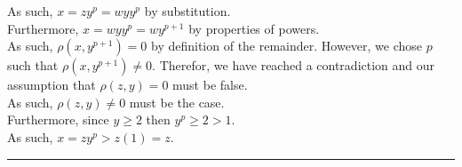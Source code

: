 \documentclass[a4paper,12pt]{article}
\begin{document}
\noindent As such, $x = zy^p = wyy^p$ by substitution.\\

\noindent Furthermore, $x = wyy^p = wy^{p + 1}$ by properties of powers.\\

\noindent As such, $\rho(x, y^{p + 1}) = 0$ by definition of the remainder. However, we chose $p$ such that $\rho(x, y^{p + 1}) \neq 0$. Therefor, we have reached a contradiction and our assumption that $\rho(z, y) = 0$ must be false.\\

\noindent As such, $\rho(z, y) \neq 0$ must be the case.\\

\noindent Furthermore, since $y \geq 2$ then $y^p \geq 2 > 1$.\\

\noindent As such, $x = zy^p > z(1) = z$.


\begin{center}
\noindent\rule{8cm}{0.4pt}
\end{center}
\noindent \\
\end{document}
